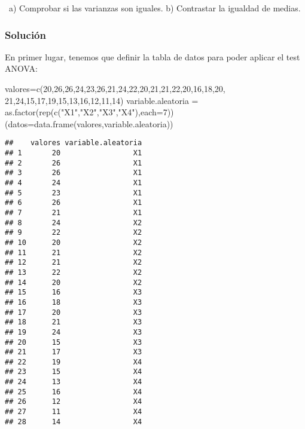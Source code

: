 \documentclass[
]{article}
\newenvironment{Shaded}{\begin{snugshade}}{\end{snugshade}}
\newcommand{\AttributeTok}[1]{\textcolor[rgb]{0.77,0.63,0.00}{#1}}
\newcommand{\DecValTok}[1]{\textcolor[rgb]{0.00,0.00,0.81}{#1}}
\newcommand{\FunctionTok}[1]{\textcolor[rgb]{0.00,0.00,0.00}{#1}}
\newcommand{\NormalTok}[1]{#1}
\newcommand{\OtherTok}[1]{\textcolor[rgb]{0.56,0.35,0.01}{#1}}
\newcommand{\StringTok}[1]{\textcolor[rgb]{0.31,0.60,0.02}{#1}}
\begin{document}
~\newline a) Comprobar si las varianzas son iguales. b) Contrastar la
igualdad de medias.

\hypertarget{soluciuxf3n-3}{%
\subsubsection{Solución}\label{soluciuxf3n-3}}

En primer lugar, tenemos que definir la tabla de datos para poder
aplicar el test ANOVA:

\begin{Shaded}
\begin{Highlighting}[]
\NormalTok{valores}\OtherTok{=}\FunctionTok{c}\NormalTok{(}\DecValTok{20}\NormalTok{,}\DecValTok{26}\NormalTok{,}\DecValTok{26}\NormalTok{,}\DecValTok{24}\NormalTok{,}\DecValTok{23}\NormalTok{,}\DecValTok{26}\NormalTok{,}\DecValTok{21}\NormalTok{,}\DecValTok{24}\NormalTok{,}\DecValTok{22}\NormalTok{,}\DecValTok{20}\NormalTok{,}\DecValTok{21}\NormalTok{,}\DecValTok{21}\NormalTok{,}\DecValTok{22}\NormalTok{,}\DecValTok{20}\NormalTok{,}\DecValTok{16}\NormalTok{,}\DecValTok{18}\NormalTok{,}\DecValTok{20}\NormalTok{,}
          \DecValTok{21}\NormalTok{,}\DecValTok{24}\NormalTok{,}\DecValTok{15}\NormalTok{,}\DecValTok{17}\NormalTok{,}\DecValTok{19}\NormalTok{,}\DecValTok{15}\NormalTok{,}\DecValTok{13}\NormalTok{,}\DecValTok{16}\NormalTok{,}\DecValTok{12}\NormalTok{,}\DecValTok{11}\NormalTok{,}\DecValTok{14}\NormalTok{)}
\NormalTok{variable.aleatoria }\OtherTok{=} \FunctionTok{as.factor}\NormalTok{(}\FunctionTok{rep}\NormalTok{(}\FunctionTok{c}\NormalTok{(}\StringTok{"X1"}\NormalTok{,}\StringTok{"X2"}\NormalTok{,}\StringTok{"X3"}\NormalTok{,}\StringTok{"X4"}\NormalTok{),}\AttributeTok{each=}\DecValTok{7}\NormalTok{))}
\NormalTok{(}\AttributeTok{datos=}\FunctionTok{data.frame}\NormalTok{(valores,variable.aleatoria))}
\end{Highlighting}
\end{Shaded}

\begin{verbatim}
##    valores variable.aleatoria
## 1       20                 X1
## 2       26                 X1
## 3       26                 X1
## 4       24                 X1
## 5       23                 X1
## 6       26                 X1
## 7       21                 X1
## 8       24                 X2
## 9       22                 X2
## 10      20                 X2
## 11      21                 X2
## 12      21                 X2
## 13      22                 X2
## 14      20                 X2
## 15      16                 X3
## 16      18                 X3
## 17      20                 X3
## 18      21                 X3
## 19      24                 X3
## 20      15                 X3
## 21      17                 X3
## 22      19                 X4
## 23      15                 X4
## 24      13                 X4
## 25      16                 X4
## 26      12                 X4
## 27      11                 X4
## 28      14                 X4
\end{verbatim}
\end{document}
